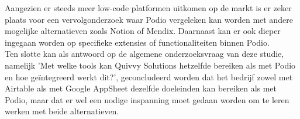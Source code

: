 Aangezien er steeds meer low-code platformen uitkomen op de markt is er zeker plaats voor een vervolgonderzoek waar Podio vergeleken kan worden met andere mogelijke alternatieven zoals Notion of Mendix. Daarnaast kan er ook dieper ingegaan worden op specifieke extensies of functionaliteiten binnen Podio. \\ 

Ten slotte kan als antwoord op de algemene onderzoeksvraag van deze studie, namelijk 'Met welke tools kan Quivvy Solutions hetzelfde bereiken als met Podio en hoe geïntegreerd werkt dit?', geconcludeerd worden dat het bedrijf zowel met Airtable als met Google AppSheet dezelfde doeleinden kan bereiken als met Podio, maar dat er wel een nodige inspanning moet gedaan worden om te leren werken met beide alternatieven. \\ 